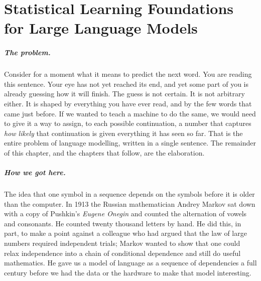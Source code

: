 
\chapter{Statistical Learning Foundations for Large Language Models}
\label{chap:stat-foundations}
\label{sec:ch1}

\scenelabel
\begin{scenestrip}
\end{scenestrip}

\paragraph{The problem.} Consider for a moment what it means to
predict the next word. You are reading this sentence. Your eye has
not yet reached its end, and yet some part of you is already
guessing how it will finish. The guess is not certain. It is not
arbitrary either. It is shaped by everything you have ever read, and
by the few words that came just before. If we wanted to teach a
machine to do the same, we would need to give it a way to assign,
to each possible continuation, a number that captures \emph{how
likely} that continuation is given everything it has seen so far.
That is the entire problem of language modelling, written in a
single sentence. The remainder of this chapter, and the chapters
that follow, are the elaboration.

\paragraph{How we got here.} The idea that one symbol in a sequence
depends on the symbols before it is older than the computer. In
1913 the Russian mathematician Andrey Markov sat down with a copy
of Pushkin's \emph{Eugene Onegin} and counted the alternation of
vowels and consonants. He counted twenty thousand letters by
hand. He did this, in part, to make a point against a colleague
who had argued that the law of large numbers required independent
trials; Markov wanted to show that one could relax independence
into a chain of conditional dependence and still do useful
mathematics. He gave us a model of language as a sequence of
dependencies a full century before we had the data or the hardware
to make that model interesting.

